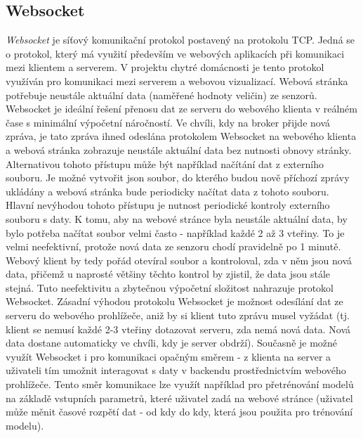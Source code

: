 \subsection*{Websocket} \label{sec:websocket}
\textit{Websocket} \cite{Wikipedia:online} je síťový komunikační protokol postavený na protokolu TCP. Jedná se o protokol, který má využití především ve webových aplikacích při komunikaci mezi klientem a serverem. V projektu chytré domácnosti je tento protokol využíván pro komunikaci mezi serverem a webovou vizualizací. Webová stránka potřebuje neustále aktuální data (naměřené hodnoty veličin) ze senzorů. Websocket je ideální řešení přenosu dat ze serveru do webového klienta v reálném čase s minimální výpočetní náročností. Ve chvíli, kdy na broker přijde nová zpráva, je tato zpráva ihned odeslána protokolem Websocket na webového klienta a webová stránka zobrazuje neustále aktuální data bez nutnosti obnovy stránky. Alternativou tohoto přístupu může být například načítání dat z externího souboru. Je možné vytvořit json soubor, do kterého budou nově příchozí zprávy ukládány a webová stránka bude periodicky načítat data z tohoto souboru. Hlavní nevýhodou tohoto přístupu je nutnost periodické kontroly externího souboru s daty. K tomu, aby na webové stránce byla neustále aktuální data, by bylo potřeba načítat soubor velmi často - například každé 2 až 3 vteřiny. To je velmi neefektivní, protože nová data ze senzoru chodí pravidelně po 1 minutě. Webový klient by tedy pořád otevíral soubor a kontroloval, zda v něm jsou nová data, přičemž u naprosté většiny těchto kontrol by zjistil, že data jsou stále stejná. Tuto neefektivitu a zbytečnou výpočetní složitost nahrazuje protokol Websocket. Zásadní výhodou protokolu Websocket je možnost odesílání dat ze serveru do webového prohlížeče, aniž by si klient tuto zprávu musel vyžádat (tj. klient se nemusí každé 2-3 vteřiny dotazovat serveru, zda nemá nová data. Nová data dostane automaticky ve chvíli, kdy je server obdrží). Současně je možné využít Websocket i pro komunikaci opačným směrem - z klienta na server a uživateli tím umožnit interagovat s daty v backendu prostřednictvím webového prohlížeče. Tento směr komunikace lze využít například pro přetrénování modelů na základě vstupních parametrů, které uživatel zadá na webové stránce (uživatel může měnit časové rozpětí dat - od kdy do kdy, která jsou použita pro trénování modelu).